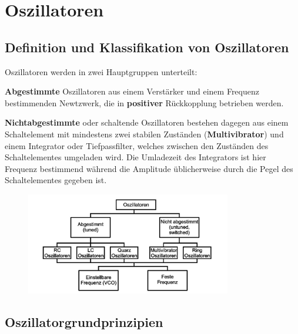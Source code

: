 \section {Oszillatoren}
\subsection {Definition und Klassifikation von Oszillatoren } 
\raggedright

Oszillatoren werden in zwei Hauptgruppen unterteilt:
\begin{compactitem}
    \item \textbf{Abgestimmte} Oszillatoren aus einem Verstärker und einem Frequenz bestimmenden Newtzwerk, die in \textbf{positiver} Rückkopplung betrieben werden.
    \item \textbf{Nichtabgestimmte} oder schaltende Oszillatoren bestehen dagegen aus einem Schaltelement mit mindestens zwei stabilen Zuständen (\textbf{Multivibrator}) und einem Integrator oder Tiefpassfilter, welches zwischen den Zuständen des Schaltelementes umgeladen wird. Die Umladezeit des Integrators ist hier Frequenz bestimmend während die Amplitude üblicherweise durch die Pegel des Schaltelementes gegeben ist.
\end{compactitem}
 
\centering
\begin{figure}[h!]
  \centering
  \includegraphics[width=0.8\textwidth]{images/Klassifikation_Oszillatortypen}
\end{figure}

\FloatBarrier
\subsection{Oszillatorgrundprinzipien }
